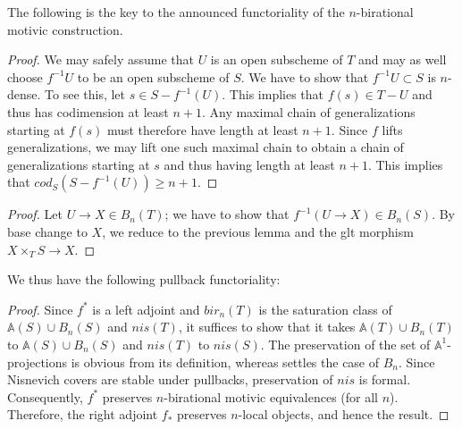 The following is the key to the announced functoriality of the $n$-birational motivic construction.

\begin{proof}
We may safely assume that $U$ is an open subscheme of $T$ and may as well choose $f^{-1}U$ to be an open subscheme of $S$. We have to show that $f^{-1}U\subset S$ is $n$-dense. To see this, let $s\in S-f^{-1}(U)$. This implies that $f(s)\in T-U$ and thus has codimension at least $n+1$. Any maximal chain of generalizations starting at $f(s)$ must therefore have length at least $n+1$. Since $f$ lifts generalizations, we may lift one such maximal chain to obtain a chain of generalizations starting at $s$ and thus having length at least $n+1$. This implies that $cod_S(S-f^{-1}(U))\geq n+1$. 
\end{proof}
\begin{proof}
       Let $U\to X\in B_n(T)$; we have to show that $f^{-1}(U\to X)\in B_n(S)$. By base change to $X$, we reduce to the previous lemma and the glt morphism $X\times _TS\to X$. 
\end{proof}

We thus have the following pullback functoriality:
\begin{proof}
   Since $f^*$ is a left adjoint and $bir_n(T)$ is the saturation class of $\mathbb{A}(S)\cup B_n(S)$ and $nis(T)$, it suffices to show that it takes $\mathbb{A}(T)\cup B_n(T)$ to $\mathbb{A}(S)\cup B_n(S)$ and $nis(T)$ to $nis(S)$. The preservation of the set of $\mathbb{A}^1$-projections is obvious from its definition, whereas  settles the case of $B_n$. Since Nisnevich covers are stable under pullbacks, preservation of $nis$ is formal. Consequently, $f^*$ preserves $n$-birational motivic equivalences (for all $n$). Therefore, the right adjoint $f_*$ preserves $n$-local objects, and hence the result.
\end{proof}


